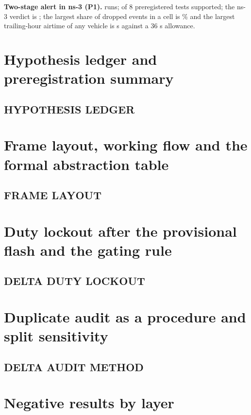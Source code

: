 \documentclass[10pt,a4paper]{article}
\begin{document}
\textbf{Two-stage alert in ns-3 (P1).} \NsRuns{} runs; \NsSupported{} of 8 preregistered tests supported; the ns-3 verdict is \NsVerdict{}; the largest share of dropped events in a cell is \NsDropMax\% and the largest trailing-hour airtime of any vehicle is \NsDutyMax{} s against a 36 s allowance.


\section{Hypothesis ledger and preregistration summary}

\subsection{HYPOTHESIS LEDGER}


\section{Frame layout, working flow and the formal abstraction table}

\subsection{FRAME LAYOUT}


\section{Duty lockout after the provisional flash and the gating rule}

\subsection{DELTA DUTY LOCKOUT}


\section{Duplicate audit as a procedure and split sensitivity}

\subsection{DELTA AUDIT METHOD}


\section{Negative results by layer}
\end{document}
